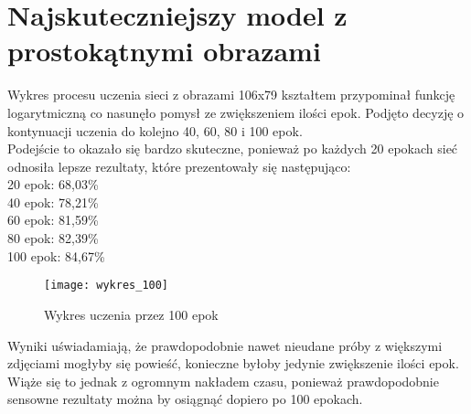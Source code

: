 \section{Najskuteczniejszy model z prostokątnymi obrazami}
Wykres procesu uczenia sieci z obrazami 106x79 kształtem przypominał funkcję logarytmiczną
co nasunęło pomysł ze zwiększeniem ilości epok. Podjęto decyzję o kontynuacji uczenia
do kolejno 40, 60, 80 i 100 epok.\\
Podejście to okazało się bardzo skuteczne, ponieważ po każdych 20 epokach
sieć odnosiła lepsze rezultaty, które prezentowały się następująco:\\
20 epok: 68,03\%\\
40 epok: 78,21\%\\
60 epok: 81,59\%\\
80 epok: 82,39\%\\
100 epok: 84,67\%\\
\begin{sidewaysfigure}
\texttt{[image: wykres\_100]}
\caption{Wykres uczenia przez 100 epok}
\end{sidewaysfigure}
Wyniki uświadamiają, że prawdopodobnie nawet nieudane próby z większymi zdjęciami
mogłyby się powieść, konieczne byłoby jedynie zwiększenie ilości epok. Wiąże się to jednak
z ogromnym nakładem czasu, ponieważ prawdopodobnie sensowne rezultaty można by osiągnąć
dopiero po 100 epokach.
